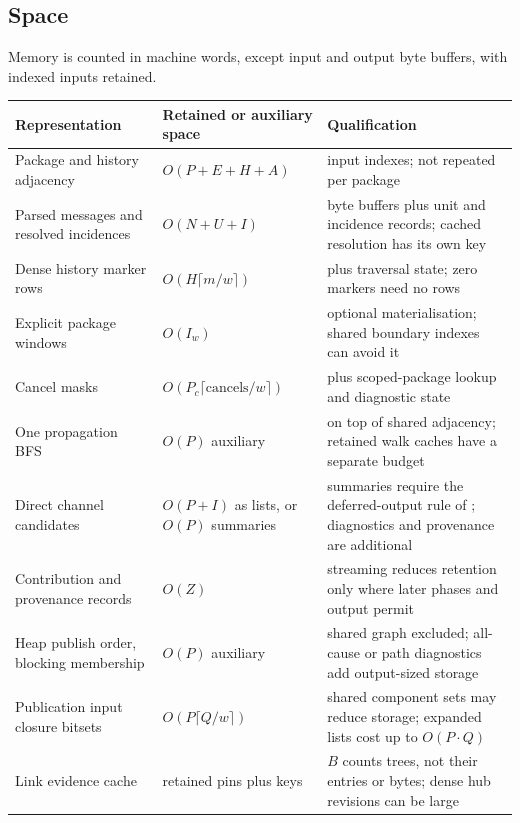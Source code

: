 \subsection{Space}

Memory is counted in machine words, except input and output byte buffers,
with indexed inputs retained.

\begin{center}
\footnotesize
\begin{longtable}{@{}L{4.2cm}L{4.0cm}L{6.4cm}@{}}
\toprule
Representation & Retained or auxiliary space & Qualification \\
\midrule
\endhead
Package and history adjacency & $O(P + E + H + A)$ & input indexes; not repeated per package \\
Parsed messages and resolved incidences & $O(N + U + I)$ & byte buffers plus unit and incidence records; cached resolution has its own key \\
Dense history marker rows & $O(H \lceil m / w \rceil)$ & plus traversal state; zero markers need no rows \\
Explicit package windows & $O(I_w)$ & optional materialisation; shared boundary indexes can avoid it \\
Cancel masks & $O(P_c \lceil \mathrm{cancels} / w \rceil)$ & plus scoped-package lookup and diagnostic state \\
One propagation BFS & $O(P)$ auxiliary & on top of shared adjacency; retained walk caches have a separate budget \\
Direct channel candidates & $O(P + I)$ as lists, or $O(P)$ summaries & summaries require the deferred-output rule of ; diagnostics and provenance are additional \\
Contribution and provenance records & $O(Z)$ & streaming reduces retention only where later phases and output permit \\
Heap publish order, blocking membership & $O(P)$ auxiliary & shared graph excluded; all-cause or path diagnostics add output-sized storage \\
Publication input closure bitsets & $O(P \lceil Q / w \rceil)$ & shared component sets may reduce storage; expanded lists cost up to $O(P \cdot Q)$ \\
Link evidence cache & retained pins plus keys & $B$ counts trees, not their entries or bytes; dense hub revisions can be large \\
\bottomrule
\end{longtable}
\end{center}

